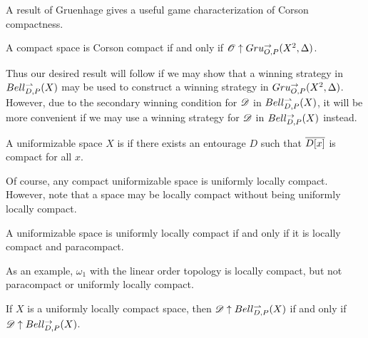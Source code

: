 A result of Gruenhage
\cite{MR752278} gives a useful game characterization of Corson compactness.

\begin{thm}
  A compact space is Corson compact if and only if
  $\mathscr{O} \uparrow Gru_{O,P}^{\to}(X^2,\Delta)$.
\end{thm}

Thus our desired result will follow if we may show that a winning strategy
in $Bell_{D,P}^{\rightharpoonup}(X)$ may be used to construct a winning strategy in
$Gru_{O,P}^{\to}(X^2,\Delta)$. However, due to the secondary winning condition
for $\mathscr{D}$ in $Bell_{D,P}^{\rightharpoonup}(X)$,
it will be more convenient if we may use a winning strategy for $\mathscr{D}$
in $Bell_{D,P}^{\to}(X)$ instead.

\begin{defn}
  A uniformizable space $X$ is  if there
  exists an entourage $D$ such that $\overline{D[x]}$ is compact
  for all $x$.
\end{defn}

Of course, any compact uniformizable space is uniformly locally compact.
However, note that a space may be locally compact without being uniformly
locally compact.

\begin{thm}
  A uniformizable space is uniformly locally compact if and only if it is
  locally compact and paracompact. \cite{MR2040233}
\end{thm}

As an example, $\omega_1$ with the linear order topology is locally compact,
but not paracompact or uniformly locally compact.

\begin{thm}
  If $X$ is a uniformly locally compact space, then
  $\mathscr{D} \uparrow Bell_{D,P}^{\rightharpoonup}(X)$ if and only if
  $\mathscr{D} \uparrow Bell_{D,P}^{\to}(X)$.
\end{thm}


